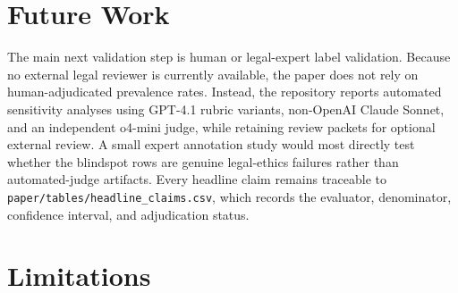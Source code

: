 \documentclass{article}
\begin{document}
\begin{table}[t]
\caption{Blindspot transcript audit before and after fact-grounded verifier shielding. Judge flags are GPT-4.1 material or misleading findings on final transcript rows, reported with counts.}
\label{tab:verifier-shield}
\centering
\small
{}
\end{table}

\section{Future Work}

The main next validation step is human or legal-expert label validation. Because no external legal reviewer is currently available, the paper does not rely on human-adjudicated prevalence rates. Instead, the repository reports automated sensitivity analyses using GPT-4.1 rubric variants, non-OpenAI Claude Sonnet, and an independent o4-mini judge, while retaining review packets for optional external review. A small expert annotation study would most directly test whether the blindspot rows are genuine legal-ethics failures rather than automated-judge artifacts. Every headline claim remains traceable to \texttt{paper/tables/headline\_claims.csv}, which records the evaluator, denominator, confidence interval, and adjudication status.

\section{Limitations}
\end{document}
